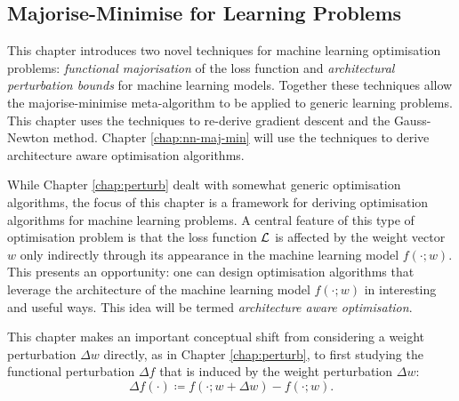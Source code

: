 \begin{refsection}

\chapter{Majorise-Minimise for Learning Problems}
\label{chap:maj-min}

\begin{tcolorbox}
This chapter introduces two novel techniques for machine learning optimisation problems: \textit{functional majorisation} of the loss function and \textit{architectural perturbation bounds} for machine learning models. Together these techniques allow the majorise-minimise meta-algorithm to be applied to generic learning problems. This chapter uses the techniques to re-derive gradient descent and the Gauss-Newton method. Chapter \ref{chap:nn-maj-min} will use the techniques to derive architecture aware optimisation algorithms.
\end{tcolorbox}

While Chapter \ref{chap:perturb} dealt with somewhat generic optimisation algorithms, the focus of this chapter is a framework for deriving optimisation algorithms for machine learning problems. A central feature of this type of optimisation problem is that the loss function $\mathcal{L}$ is affected by the weight vector $w$ only indirectly through its appearance in the machine learning model $f(\cdot;w)$. This presents an opportunity: one can design optimisation algorithms that leverage the architecture of the machine learning model $f(\cdot;w)$ in interesting and useful ways. This idea will be termed \textit{architecture aware optimisation}.

This chapter makes an important conceptual shift from considering a weight perturbation $\Delta w$ directly, as in Chapter \ref{chap:perturb}, to first studying the functional perturbation $\Delta f$  that is induced by the weight perturbation $\Delta w$:
\begin{equation}
        \Delta f(\cdot) \coloneqq f(\cdot;w+\Delta w)-f(\cdot;w).
\end{equation}


\end{refsection}
